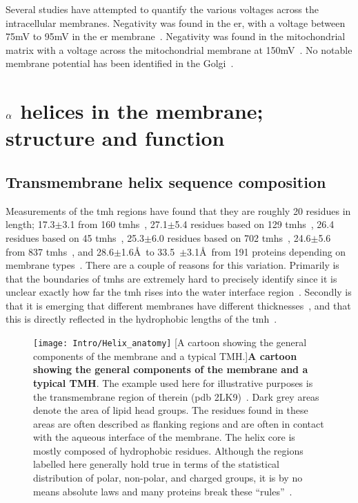 Several studies have attempted to quantify the various voltages across the intracellular membranes.
Negativity was found in the \gls{er}, with a voltage between 75mV to 95mV in the \gls{er} membrane~\cite{Qin2011, Worley1994}.
Negativity was found in the mitochondrial matrix with a  voltage across the mitochondrial membrane at 150mV~\cite{Perry2011}.
No notable membrane potential has been identified in the Golgi~\cite{Schapiro2000, Llopis1998}.

\section{$\protect\alpha$ helices in the membrane; structure and function}

\subsection{Transmembrane helix sequence composition}

Measurements of the \gls{tmh} regions have found that they are roughly 20 residues in length; 17.3$\pm$3.1 from 160 \gls{tmh}s~\cite{Hildebrand2004}, 27.1$\pm$5.4 residues based on 129 \gls{tmh}s~\cite{Ulmschneider2001}, 26.4 residues based on 45 \gls{tmh}s~\cite{Bowie1997}, 25.3$\pm$6.0 residues based on 702 \gls{tmh}s~\cite{Cuthbertson2005a}, 24.6$\pm$5.6 from 837 \gls{tmh}s~\cite{Baeza-Delgado2013}, and 28.6$\pm$1.6\AA~to 33.5~$\pm$3.1\AA~from 191 proteins depending on membrane types~\cite{Pogozheva2013}.
There are a couple of reasons for this variation.
Primarily is that the boundaries of \gls{tmh}s are extremely hard to precisely identify since it is unclear exactly how far the \gls{tmh} rises into the water interface region~\cite{VonHeijne2006}.
Secondly is that it is emerging that different membranes have different thicknesses~\cite{VanMeer2008}, and that this is directly reflected in the hydrophobic lengths of the \gls{tmh}~\cite{Sharpe2010, Pogozheva2013}.

\begin{figure}[ht]
\centering
\texttt{[image: Intro/Helix\_anatomy]}
		[A cartoon showing the general components of the membrane and a typical TMH.]{\textbf{A cartoon showing the general components of the membrane and a typical TMH}.
		The example used here for illustrative purposes is the transmembrane region of therein (\gls{pdb} 2LK9)~\cite{Skasko2012}.
		Dark grey areas denote the area of lipid head groups.
		The residues found in these areas are often described as flanking regions and are often in contact with the aqueous interface of the membrane.
		The helix core is mostly composed of hydrophobic residues.
		Although the regions labelled here generally hold true in terms of the statistical distribution of polar, non-polar, and charged groups, it is by no means absolute laws and many proteins break these ``rules''~\cite{Sharpe2010, Baeza-Delgado2013, Pogozheva2013}.}

\label{fig:helixcartoon1}
\end{figure}

